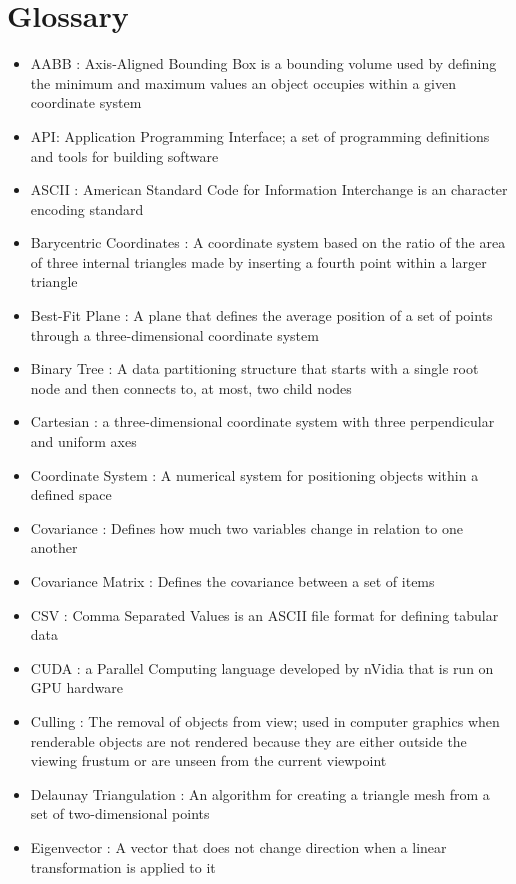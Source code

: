 \chapter{Glossary}

\begin{itemize}
   \item AABB : Axis-Aligned Bounding Box is a bounding volume used by defining the minimum and maximum values an object occupies within a given coordinate system
   \item API: Application Programming Interface; a set of programming definitions and tools for building software
   \item ASCII : American Standard Code for Information Interchange is an character encoding standard
   \item Barycentric Coordinates : A coordinate system based on the ratio of the area of three internal triangles made by inserting a fourth point within a larger triangle
   \item Best-Fit Plane : A plane that defines the average position of a set of points through a three-dimensional coordinate system
   \item Binary Tree : A data partitioning structure that starts with a single root node and then connects to, at most, two child nodes
   \item Cartesian : a three-dimensional coordinate system with three perpendicular and uniform axes
   \item Coordinate System : A numerical system for positioning objects within a defined space
   \item Covariance : Defines how much two variables change in relation to one another
   \item Covariance Matrix : Defines the covariance between a set of items
   \item CSV : Comma Separated Values is an ASCII file format for defining tabular data
   \item CUDA : a Parallel Computing language developed by nVidia that is run on GPU hardware
   \item Culling : The removal of objects from view; used in computer graphics when renderable objects are not rendered because they are either outside the viewing frustum or are unseen from the current viewpoint
   \item Delaunay Triangulation : An algorithm for creating a triangle mesh from a set of two-dimensional points
   \item Eigenvector : A vector that does not change direction when a linear transformation is applied to it

\end{itemize}
